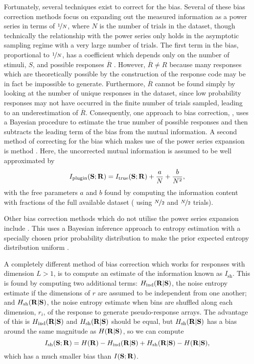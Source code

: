 Fortunately, several techniques exist to correct for the bias.
Several of these bias correction methods focus on expanding out the measured information as a power series \cite{Miller1955,Treves1995} in terms of $\nicefrac{1}{N}$, where $N$ is the number of trials in the dataset, though technically the relationship with the power series only holds in the asymptotic sampling regime with a very large number of trials.
The first term in the bias, proportional to $\nicefrac{1}{N}$, has a coefficient which depends only on the number of stimuli, $S$, and possible responses $\overline{R}$ .
However, $\overline{R} \neq R$ because many responses which are theoretically possible by the construction of the response code may be in fact be impossible to generate.
Furthermore, $\overline{R}$ cannot be found simply by looking at the number of unique responses in the dataset, since low probability responses may not have occurred in the finite number of trials sampled, leading to an underestimation of $\overline{R}$.
Consequently, one approach to bias correction,  \cite{Panzeri1996}, uses a Bayesian procedure to estimate the true number of possible responses and then subtracts the leading term of the bias from the mutual information.
A second method of correcting for the bias which makes use of the power series expansion is  method \cite{Strong1998}.
Here, the uncorrected mutual information is assumed to be well approximated by
$$
I_{\text{plugin}}(\mathbf{S};\mathbf{R}) = I_{\text{true}}(\mathbf{S};\mathbf{R}) + \frac{a}{N} + \frac{b}{N^2}
,$$
with the free parameters $a$ and $b$ found by computing the information content with fractions of the full available dataset (\ie{} using $\nicefrac{N}{2}$ and $\nicefrac{N}{2}$ trials).

Other bias correction methods which do not utilise the power series expansion include .
This uses a Bayesian inference approach to entropy estimation with a specially chosen prior probability distribution to make the prior expected entropy distribution uniform \cite{Nemenman2004}.

A completely different method of bias correction which works for responses with dimension $L > 1$, is to compute an estimate of the information known as $I_{\text{sh}}$.
This is found \cite{Montemurro2007} by computing two additional terms: $H_\text{ind}( \mathbf{R} | \mathbf{S} )$, the noise entropy estimate if the dimensions of $r$ are assumed to be independent from one another; and $H_\text{sh}( \mathbf{R} | \mathbf{S} )$, the noise entropy estimate when bins are shuffled along each dimension, $r_i$, of the response to generate pseudo-response arrays.
The advantage of this is $H_\text{ind}( \mathbf{R} | \mathbf{S} )$ and $H_\text{sh}( \mathbf{R} | \mathbf{S} )$ should be equal, but $H_\text{sh}( \mathbf{R} | \mathbf{S} )$ has a bias around the same magnitude as $H( \mathbf{R} | \mathbf{S} )$, so we can compute
$$
I_{\text{sh}}(\mathbf{S};\mathbf{R}) = H( \mathbf{R} ) - H_\text{ind}( \mathbf{R} | \mathbf{S} ) + H_\text{sh}( \mathbf{R} | \mathbf{S} ) - H( \mathbf{R} | \mathbf{S} )
,$$
which has a much smaller bias than $I(\mathbf{S};\mathbf{R})$.

